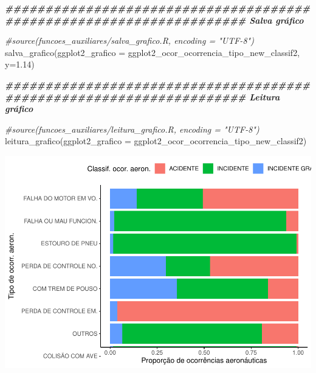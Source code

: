 \documentclass[
]{article}
\newenvironment{Shaded}{\begin{snugshade}}{\end{snugshade}}
\newcommand{\AttributeTok}[1]{\textcolor[rgb]{0.77,0.63,0.00}{#1}}
\newcommand{\CommentTok}[1]{\textcolor[rgb]{0.56,0.35,0.01}{\textit{#1}}}
\newcommand{\DocumentationTok}[1]{\textcolor[rgb]{0.56,0.35,0.01}{\textbf{\textit{#1}}}}
\newcommand{\FloatTok}[1]{\textcolor[rgb]{0.00,0.00,0.81}{#1}}
\newcommand{\FunctionTok}[1]{\textcolor[rgb]{0.00,0.00,0.00}{#1}}
\newcommand{\NormalTok}[1]{#1}
\begin{document}
\begin{Shaded}
\begin{Highlighting}[]
\DocumentationTok{\#\#\#\#\#\#\#\#\#\#\#\#\#\#\#\#\#\#\#\#\#\#\#\#\#\#\#\#\#\#\#\#\#\#\#\#\#\#\#\#\#\#\#\#\#\#\#\#\#\#\#\#\#\#\#\#\#\#\#\#\#\#\#\#\#\#\#\# Salva gráfico}

\CommentTok{\#source(\textquotesingle{}funcoes\_auxiliares/salva\_grafico.R\textquotesingle{}, encoding = "UTF{-}8")}
\FunctionTok{salva\_grafico}\NormalTok{(}\AttributeTok{ggplot2\_grafico =}\NormalTok{ ggplot2\_ocor\_ocorrencia\_tipo\_new\_classif2, }\AttributeTok{y=}\FloatTok{1.14}\NormalTok{)}

\DocumentationTok{\#\#\#\#\#\#\#\#\#\#\#\#\#\#\#\#\#\#\#\#\#\#\#\#\#\#\#\#\#\#\#\#\#\#\#\#\#\#\#\#\#\#\#\#\#\#\#\#\#\#\#\#\#\#\#\#\#\#\#\#\#\#\#\#\#\#\#\# Leitura gráfico}

\CommentTok{\#source(\textquotesingle{}funcoes\_auxiliares/leitura\_grafico.R\textquotesingle{}, encoding = "UTF{-}8")}
\FunctionTok{leitura\_grafico}\NormalTok{(}\AttributeTok{ggplot2\_grafico =}\NormalTok{ ggplot2\_ocor\_ocorrencia\_tipo\_new\_classif2)}
\end{Highlighting}
\end{Shaded}

\begin{center}\includegraphics[width=1\linewidth]{../4.Relatorio/pdf/index_files/figure-latex/unnamed-chunk-50-1} \end{center}
\end{document}
